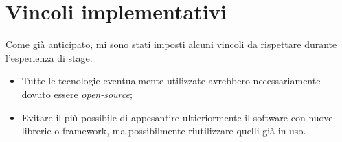 \section{Vincoli implementativi} 
Come già anticipato, mi sono stati imposti alcuni vincoli da rispettare durante l'esperienza di stage:
\begin{itemize}
	\item Tutte le tecnologie eventualmente utilizzate avrebbero necessariamente dovuto essere \emph{open-source};
	\item Evitare il più possibile di appesantire ultieriormente il software con nuove librerie o framework, ma possibilmente riutilizzare quelli già in uso.
\end{itemize}
